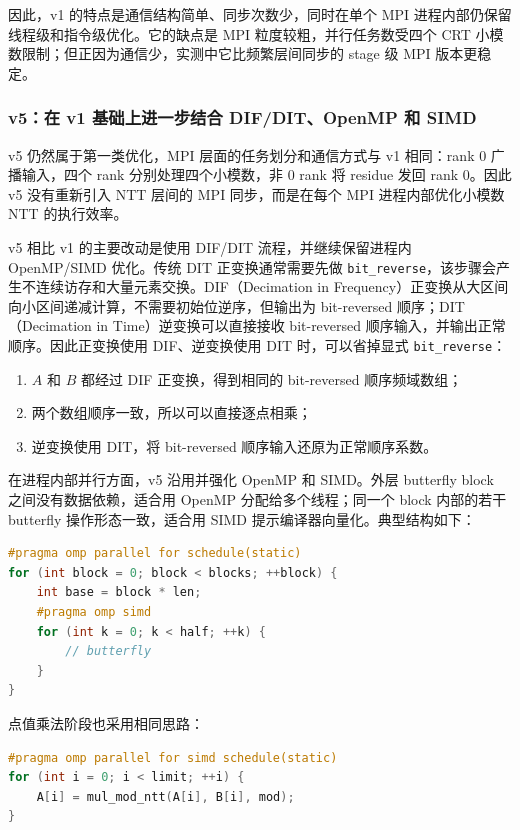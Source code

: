\documentclass[a4paper]{article}
\begin{document}
因此，v1 的特点是通信结构简单、同步次数少，同时在单个 MPI 进程内部仍保留线程级和指令级优化。它的缺点是 MPI 粒度较粗，并行任务数受四个 CRT 小模数限制；但正因为通信少，实测中它比频繁层间同步的 stage 级 MPI 版本更稳定。

\subsubsection{v5：在 v1 基础上进一步结合 DIF/DIT、OpenMP 和 SIMD}

v5 仍然属于第一类优化，MPI 层面的任务划分和通信方式与 v1 相同：rank 0 广播输入，四个 rank 分别处理四个小模数，非 0 rank 将 residue 发回 rank 0。因此 v5 没有重新引入 NTT 层间的 MPI 同步，而是在每个 MPI 进程内部优化小模数 NTT 的执行效率。

v5 相比 v1 的主要改动是使用 DIF/DIT 流程，并继续保留进程内 OpenMP/SIMD 优化。传统 DIT 正变换通常需要先做 \texttt{bit\_reverse}，该步骤会产生不连续访存和大量元素交换。DIF（Decimation in Frequency）正变换从大区间向小区间递减计算，不需要初始位逆序，但输出为 bit-reversed 顺序；DIT（Decimation in Time）逆变换可以直接接收 bit-reversed 顺序输入，并输出正常顺序。因此正变换使用 DIF、逆变换使用 DIT 时，可以省掉显式 \texttt{bit\_reverse}：
\begin{enumerate}
    \item $A$ 和 $B$ 都经过 DIF 正变换，得到相同的 bit-reversed 顺序频域数组；
    \item 两个数组顺序一致，所以可以直接逐点相乘；
    \item 逆变换使用 DIT，将 bit-reversed 顺序输入还原为正常顺序系数。
\end{enumerate}

在进程内部并行方面，v5 沿用并强化 OpenMP 和 SIMD。外层 butterfly block 之间没有数据依赖，适合用 OpenMP 分配给多个线程；同一个 block 内部的若干 butterfly 操作形态一致，适合用 SIMD 提示编译器向量化。典型结构如下：
\begin{lstlisting}[language=C++,title=v5 的进程内 OpenMP/SIMD 结构]
#pragma omp parallel for schedule(static)
for (int block = 0; block < blocks; ++block) {
    int base = block * len;
    #pragma omp simd
    for (int k = 0; k < half; ++k) {
        // butterfly
    }
}
\end{lstlisting}

点值乘法阶段也采用相同思路：
\begin{lstlisting}[language=C++]
#pragma omp parallel for simd schedule(static)
for (int i = 0; i < limit; ++i) {
    A[i] = mul_mod_ntt(A[i], B[i], mod);
}
\end{lstlisting}
\end{document}
